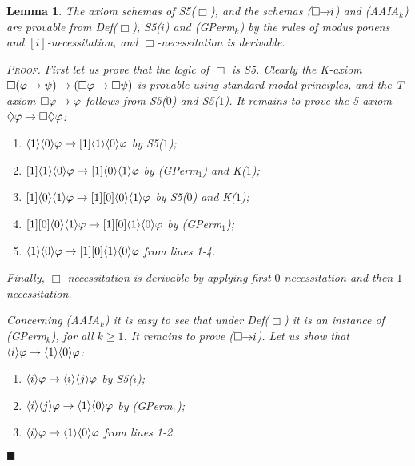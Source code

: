 \documentclass{article}
\newtheorem{lemma}{Lemma}
\newenvironment{pf}{\em \medskip\noindent \textsc{Proof.}}
{\hspace*{\fill}\nolinebreak[2]\hspace*{\fill}$\blacksquare$\medskip}
\renewcommand{\phi}{\varphi}
\newcommand{\cstit}[1]{[{#1}]}           \newcommand{\poscstit}[1]{\langle {#1} \rangle}    \newcommand{\dstit}[2]{[{#1}\ \mathit{dstit}\! :{#2}]}
\newcommand{\InclBox}[1]{$\Box \!\! \imp \!\! #1$}
\begin{document}
\begin{lemma}\label{lem:BoxIsS5}
The axiom schemas of S5($\Box$),
and the schemas (\InclBox{i}) and (AAIA$_k$)
are provable from Def($\Box$), S5($i$) and (GPerm$_k$)
by the rules of modus ponens and $\cstit{i}$-necessitation,
and $\Box$-necessitation is derivable.

\begin{pf}
First let us prove that the logic of $\Box$ is S5.
Clearly the K-axiom
$\Box(\phi\imp\psi) \imp (\Box\phi\imp\Box\psi) $
is provable using standard modal principles, and the T-axiom
$\Box\phi\imp\phi$ follows from S5($0$) and S5($1$).
It remains to prove the 5-axiom $\Diamond\phi \imp \Box\Diamond\phi$:
\begin{enumerate}
\item
$                  \poscstit{1}\poscstit{0}\phi \imp
 \cstit{1}         \poscstit{1}\poscstit{0}\phi       $  \hfill by S5($1$);
\item
$\cstit{1}         \poscstit{1}\poscstit{0}\phi \imp
 \cstit{1}         \poscstit{0}\poscstit{1}\phi       $  \hfill by (GPerm$_1$)
                                                      and K($1$);
\item
$\cstit{1}         \poscstit{0}\poscstit{1}\phi \imp
 \cstit{1}\cstit{0}\poscstit{0}\poscstit{1}\phi       $  \hfill by S5($0$)
                                                      and K($1$);
\item
$\cstit{1}\cstit{0}\poscstit{0}\poscstit{1}\phi \imp
 \cstit{1}\cstit{0}\poscstit{1}\poscstit{0}\phi       $  \hfill by (GPerm$_1$);
\item
$                  \poscstit{1}\poscstit{0}\phi \imp
 \cstit{1}\cstit{0}\poscstit{1}\poscstit{0}\phi       $  \hfill from lines 1-4.
\end{enumerate}
Finally, $\Box$-necessitation is derivable
by applying first $0$-necessitation and then $1$-necessitation.

Concerning (AAIA$_k$) it is easy to see that under Def($\Box$)
it is an instance of (GPerm$_k$), for all $k \geq 1$.
It remains to prove (\InclBox{i}).
Let us show that $\poscstit{i}\phi \imp \poscstit{1}\poscstit{0}\phi$:
\begin{enumerate}
\item $\poscstit{i}\phi \imp \poscstit{i}\poscstit{j}\phi$             \hfill by S5($i$);
\item $\poscstit{i}\poscstit{j}\phi \imp \poscstit{1}\poscstit{0}\phi$ \hfill by (GPerm$_1$);
\item $\poscstit{i}\phi \imp \poscstit{1}\poscstit{0}\phi$ \hfill from lines 1-2.
\end{enumerate}

\end{pf}

\end{lemma}
\end{document}
